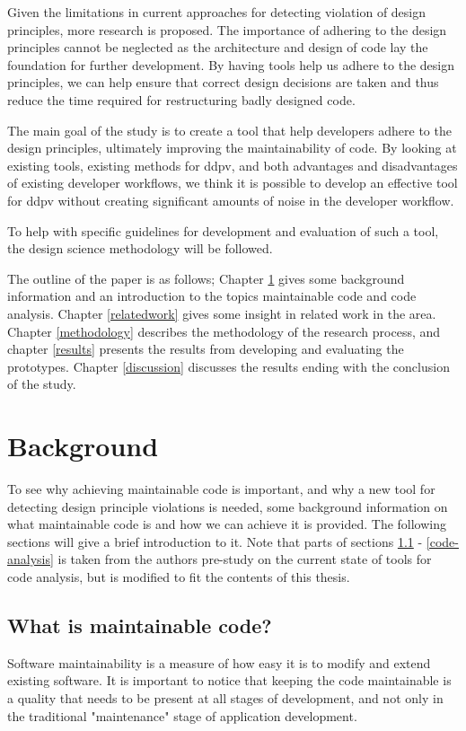 \documentclass{report}
\begin{document}
Given the limitations in current approaches for detecting violation of design principles, more research is proposed. The importance of adhering to the design principles cannot be neglected as the architecture and design of code lay the foundation for further development. By having tools help us adhere to the design principles, we can help ensure that correct design decisions are taken and thus reduce the time required for restructuring badly designed code.  

The main goal of the study is to create a tool that help developers adhere to the design principles, ultimately improving the maintainability of code. By looking at existing tools, existing methods for \gls{ddpv}, and both advantages and disadvantages of existing developer workflows, we think it is possible to develop an effective tool for \gls{ddpv} without creating significant amounts of noise in the developer workflow.

To help with specific guidelines for development and evaluation of such a tool, the design science methodology will be followed.


The outline of the paper is as follows; Chapter \ref{background} gives some background information and an introduction to the topics maintainable code and code analysis. Chapter \ref{relatedwork} gives some insight in related work in the area. Chapter \ref{methodology} describes the methodology of the research process, and chapter \ref{results} presents the results from developing and evaluating the prototypes. Chapter \ref{discussion} discusses the results ending with the conclusion of the study.  

\chapter{Background}

\label{background}
To see why achieving maintainable code is important, and why a new tool for detecting design principle violations is needed, some background information on what maintainable code is and how we can achieve it is provided. The following sections will give a brief introduction to it. Note that parts of sections \ref{maintainable-code} - \ref{code-analysis} is taken from the authors pre-study on the current state of tools for code analysis\cite{prestudy}, but is modified to fit the contents of this thesis.

\section{What is maintainable code?}
\label{maintainable-code}
Software maintainability is a measure of how easy it is to modify and extend existing software. It is important to notice that keeping the code maintainable is a quality that needs to be present at all stages of development, and not only in the traditional "maintenance" stage of application development.  
\end{document}
